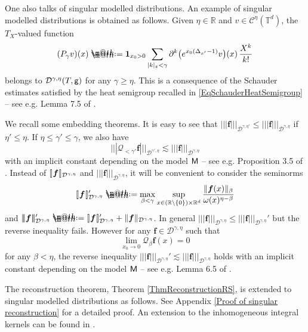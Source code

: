 \documentclass[10pt, reqno]{amsart}
\makeatletter
\numberwithin{subsection}{section}
\numberwithin{subsubsection}{subsection}
\numberwithin{equation}{section} %
\theoremstyle{mystyle}
\theoremstyle{mystyle2}
\theoremstyle{mystyle3}
\newcommand{\brarb}[1]{[\hspace{-0.5mm}]#1[\hspace{-0.5mm}]}
\newcommand{\bsf}{\boldsymbol{f}}
\newcommand\bbR{\mathbb{R}}
\newcommand{\bbT}{\mathbb{T}}
\newcommand{\mcC}{\mathcal{C}}
\newcommand{\mcD}{\mathcal{D}}
\newcommand{\mcQ}{\mathcal{Q}}
\newcommand*{\defeq}{\mathrel{\rlap{%
                     \raisebox{0.3ex}{$\m@th\cdot$}}%
                     \raisebox{-0.3ex}{$\m@th\cdot$}}%
                     =}
\makeatother
\begin{document}
\medskip

One also talks of singular modelled distributions. An example of singular modelled distributions is obtained as follows. Given $\eta\in\bbR$ and $v\in\mcC^\eta(\bbT^d)$, the $T_X$-valued function
\begin{align}\label{eq heat propagator}  
(P_\gamma v)(x) \defeq  {\bf1}_{x_0>0}\sum_{|k|_{\frak{s}}<\gamma} \partial^k\big(e^{x_0(\Delta_{x'}-1)}v\big)(x)\,\frac{X^k}{k!}
\end{align}
belongs to $\mcD^{\gamma,\eta}(T,\sf g)$ for any $\gamma\ge\eta$. This is 
a consequence of the Schauder estimates satisfied by the heat semigroup recalled in \eqref{EqSchauderHeatSemigroup} -- see e.g. Lemma 7.5 of \cite{Hai14}. 

\medskip

We recall some embedding theorems. It is easy to see that $|\!|\!| \bsf |\!|\!|_{\mcD^{\gamma,\eta'}}\le|\!|\!| \bsf |\!|\!|_{\mcD^{\gamma,\eta}}$ if $\eta'\le\eta$. If $\eta\le\gamma'\le\gamma$, we also have
$$
|\!|\!| \mcQ_{<\gamma'}\bsf |\!|\!|_{\mcD^{\gamma',\eta}}\lesssim|\!|\!| \bsf |\!|\!|_{\mcD^{\gamma,\eta}}
$$
with an implicit constant depending on the model $\sf M$ -- see e.g. Proposition 3.5 of \cite{HT24}. Instead of $\brarb{\bsf}_{\mcD^{\gamma,\eta}}$ and $|\!|\!| \bsf |\!|\!|_{\mcD^{\gamma,\eta}}$, it will be convenient to consider the seminorms
$$
\brarb{\bsf}_{\mcD^{\gamma,\eta}}'
\defeq 
\max_{\beta<\gamma}\sup_{x\in(\bbR\setminus\{0\})\times\bbR^d}
\frac{\|\bsf(x)\|_\beta}{\omega(x)^{\eta-\beta}}
$$
and $|\!|\!| \bsf |\!|\!|_{\mcD^{\gamma,\eta}}' \defeq \brarb{\bsf}_{\mcD^{\gamma,\eta}}'+ \|\bsf\|_{\mcD^{\gamma,\eta}}$.
In general $|\!|\!| \bsf |\!|\!|_{\mcD^{\gamma,\eta}}\le|\!|\!| \bsf |\!|\!|_{\mcD^{\gamma,\eta}}'$ but the reverse inequality fails. However for any $\bsf\in\mcD^{\gamma,\eta}$ such that
$$
\lim_{x_0\to0}\mcQ_\beta \bsf(x)=0
$$
for any $\beta<\eta$, the reverse inequality $|\!|\!| \bsf |\!|\!|_{\mcD^{\gamma,\eta}}'\lesssim|\!|\!| \bsf |\!|\!|_{\mcD^{\gamma,\eta}}$ holds with an implicit constant depending on the model $\sf M$ -- see e.g. Lemma 6.5 of \cite{Hai14}.

\medskip

The reconstruction theorem, Theorem \ref{ThmReconstructionRS}, is extended to singular modelled distributions as follows. See Appendix {\sf \ref{Proof of singular reconstruction}} for a detailed proof. An extension to the inhomogeneous integral kernels can be found in \cite{HT24}.

\medskip
\end{document}
